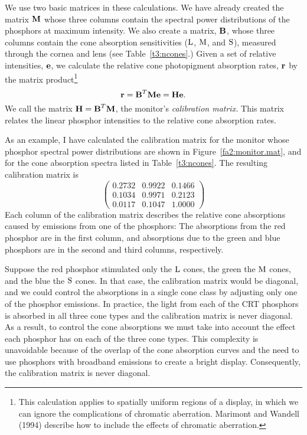 We use two basic matrices in these calculations.  We have already
created the matrix $\mbox{$ \bf M $}$ whose three columns contain the spectral
power distributions of the phosphors at maximum intensity.  We also
create a matrix, $\mbox{$\bf B$}$, whose three columns contain the cone
absorption sensitivities ($\mbox{L}$, $\mbox{M}$, and $\mbox{S}$), measured through
the cornea and lens (see Table~\ref{t3:ncones}.)  Given a set of
relative intensities, $\mbox{$\bf e$}$, we calculate the relative cone
photopigment absorption rates, $\mbox{$\bf r$}$ by the matrix
product\footnote{This calculation applies to spatially uniform regions
of a display, in which we can ignore the complications of chromatic
aberration.  Marimont and Wandell (1994) describe how to include the
effects of chromatic aberration.}
\begin{equation}
\label{ea2:display}
\mbox{$\bf r$} = \mbox{$\bf B$}^T \mbox{$ \bf M $} \mbox{$\bf e$} = \mbox{$\mbox{${\bf H}$}$} \mbox{$\bf e$} .
\end{equation}
We call the matrix $\mbox{$\mbox{${\bf H}$}$} = \mbox{$\bf B$}^T \mbox{$ \bf M $}$, the
monitor's {\em calibration matrix.}  This matrix relates the linear
phosphor intensities to the relative cone absorption rates.

As an example, I have calculated the calibration matrix for the
monitor whose phosphor spectral power distributions are shown in
Figure~\ref{fa2:monitor.mat}, and for the cone absorption spectra
listed in Table~\ref{t3:ncones}.  The resulting calibration matrix is
\[
\left (
 \begin{array}{ccc}
    0.2732 &   0.9922 &   0.1466 \\
    0.1034 &   0.9971 &   0.2123 \\
    0.0117 &   0.1047 &   1.0000
 \end{array}
\right )
\]
Each column of the calibration matrix describes the relative
cone absorptions caused by emissions from one of the
phosphors: The absorptions from the red phosphor are in the first
column, and absorptions due to the green and blue phosphors are in the
second and third columns, respectively.

Suppose the red phosphor stimulated only the $\mbox{L}$ cones, the green
the $\mbox{M}$ cones, and the blue the $\mbox{S}$ cones.  In that case, the
calibration matrix would be diagonal, and we could control the
absorptions in a single cone class by adjusting only one of the
phosphor emissions.  In practice, the light from each of the CRT
phosphors is absorbed in all three cone types and the calibration
matrix is never diagonal.  As a result, to control the cone
absorptions we must take into account the effect each phosphor has on
each of the three cone types.  This complexity is unavoidable because
of the overlap of the cone absorption curves and the need to use
phosphors with broadband emissions to create a bright display.
Consequently, the calibration matrix is never diagonal.

